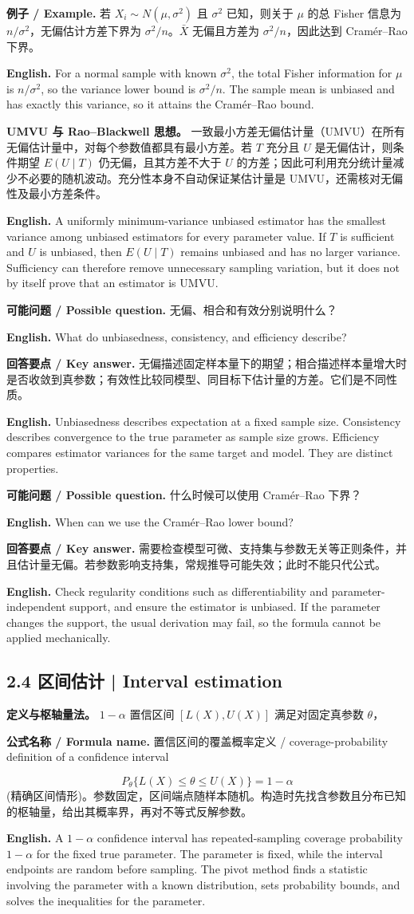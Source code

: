 \documentclass[UTF8,11pt,a4paper]{ctexart}
\newcommand{\EN}[1]{\par\noindent\textbf{English.} #1\par}
\newcommand{\FORMULA}[2]{\par\noindent\textbf{公式名称 / Formula name.} #1 / #2\par}
\newcommand{\EX}[2]{\par\noindent\textbf{例子 / Example.} #1\par\EN{#2}}
\newcommand{\ASK}[4]{\par\noindent\textbf{可能问题 / Possible question.} #1\par\EN{#2}\noindent\textbf{回答要点 / Key answer.} #3\par\EN{#4}\medskip}
\begin{document}
\EX{若 $X_i\sim N(\mu,\sigma^2)$ 且 $\sigma^2$ 已知，则关于 $\mu$ 的总 Fisher 信息为 $n/\sigma^2$，无偏估计方差下界为 $\sigma^2/n$。$\bar X$ 无偏且方差为 $\sigma^2/n$，因此达到 Cramér--Rao 下界。}{For a normal sample with known $\sigma^2$, the total Fisher information for $\mu$ is $n/\sigma^2$, so the variance lower bound is $\sigma^2/n$. The sample mean is unbiased and has exactly this variance, so it attains the Cramér--Rao bound.}

\noindent\textbf{UMVU 与 Rao--Blackwell 思想。} 一致最小方差无偏估计量（UMVU）在所有无偏估计量中，对每个参数值都具有最小方差。若 $T$ 充分且 $U$ 是无偏估计，则条件期望 $E(U\mid T)$ 仍无偏，且其方差不大于 $U$ 的方差；因此可利用充分统计量减少不必要的随机波动。充分性本身不自动保证某估计量是 UMVU，还需核对无偏性及最小方差条件。
\EN{A uniformly minimum-variance unbiased estimator has the smallest variance among unbiased estimators for every parameter value. If $T$ is sufficient and $U$ is unbiased, then $E(U\mid T)$ remains unbiased and has no larger variance. Sufficiency can therefore remove unnecessary sampling variation, but it does not by itself prove that an estimator is UMVU.}

\ASK{无偏、相合和有效分别说明什么？}{What do unbiasedness, consistency, and efficiency describe?}{无偏描述固定样本量下的期望；相合描述样本量增大时是否收敛到真参数；有效性比较同模型、同目标下估计量的方差。它们是不同性质。}{Unbiasedness describes expectation at a fixed sample size. Consistency describes convergence to the true parameter as sample size grows. Efficiency compares estimator variances for the same target and model. They are distinct properties.}

\ASK{什么时候可以使用 Cramér--Rao 下界？}{When can we use the Cramér--Rao lower bound?}{需要检查模型可微、支持集与参数无关等正则条件，并且估计量无偏。若参数影响支持集，常规推导可能失效；此时不能只代公式。}{Check regularity conditions such as differentiability and parameter-independent support, and ensure the estimator is unbiased. If the parameter changes the support, the usual derivation may fail, so the formula cannot be applied mechanically.}

\subsection*{2.4 区间估计 | Interval estimation}
\noindent\textbf{定义与枢轴量法。} $1-\alpha$ 置信区间 $[L(X),U(X)]$ 满足对固定真参数 $\theta$，
\FORMULA{置信区间的覆盖概率定义}{coverage-probability definition of a confidence interval}
\[
P_\theta\{L(X)\le\theta\le U(X)\}=1-\alpha
\]
(精确区间情形)。参数固定，区间端点随样本随机。构造时先找含参数且分布已知的枢轴量，给出其概率界，再对不等式反解参数。
\EN{A $1-\alpha$ confidence interval has repeated-sampling coverage probability $1-\alpha$ for the fixed true parameter. The parameter is fixed, while the interval endpoints are random before sampling. The pivot method finds a statistic involving the parameter with a known distribution, sets probability bounds, and solves the inequalities for the parameter.}
\end{document}
